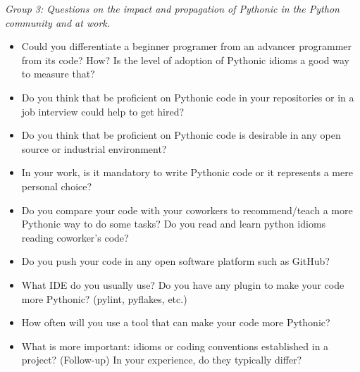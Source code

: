 \documentclass[a4paper]{article}
\begin{document}
\textit{Group 3: Questions on the impact and propagation of Pythonic in the Python community and at work.}
\begin{itemize}
  \item Could you differentiate a beginner programer from an advancer programmer from its code? How? Is the level of adoption of Pythonic idioms a good way to measure that?
  \item Do you think that be proficient on Pythonic code in your repositories or in a job interview could help to get hired?
  \item Do you think that be proficient on Pythonic code is desirable in any open source or industrial environment?
  \item In your work, is it mandatory to write Pythonic code or it represents a mere personal choice?
  \item Do you compare your code with your coworkers to recommend/teach a more Pythonic way to do some tasks? Do you read and learn python idioms reading coworker's code?
  \item Do you push your code in any open software platform such as GitHub? 
  \item What IDE do you usually use? Do you have any plugin to make your code more Pythonic? (pylint, pyflakes, etc.)
  \item How often will you use a tool that can make your code more Pythonic?
  \item What is more important: idioms or coding conventions established in a project?
  (Follow-up) In your experience, do they typically differ?
\end{itemize}
\end{document}
